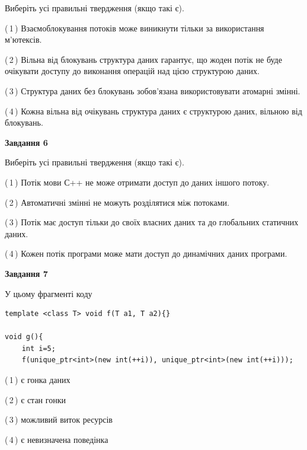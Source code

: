 \documentclass[12pt, ukrainian]{article}
\begin{document}
\begin {large}
{Виберіть усі правильні твердження (якщо такі є).\par
\vspace{2mm}

(\,1\,) Взаємоблокування потоків може виникнути тільки за використання м’ютексів.%

(\,2\,) Вільна від блокувань структура даних гарантує, що жоден потік не буде очікувати доступу до виконання операцій над цією структурою даних.%

(\,3\,) Структура даних без блокувань зобов’язана використовувати атомарні змінні.%

(\,4\,) Кожна вільна від очікувань структура даних є структурою даних, вільною від блокувань.%
\newpage


\begin{center}
\textbf{Завдання 6}
\end{center}

Виберіть усі правильні твердження (якщо такі є).\par
\vspace{2mm}

(\,1\,) Потік мови С++ не може отримати доступ до даних іншого потоку.%

(\,2\,) Автоматичні змінні не можуть розділятися між потоками.%

(\,3\,) Потік має доступ тільки до своїх власних даних та до глобальних статичних даних.%

(\,4\,) Кожен потік програми може мати доступ до динамічних даних програми.%


\begin{center}
\textbf{Завдання 7}
\end{center}

У цьому фрагменті коду
\begin{verbatim}
template <class T> void f(T a1, T a2){}

void g(){
    int i=5;
    f(unique_ptr<int>(new int(++i)), unique_ptr<int>(new int(++i)));
\end{verbatim}

(\,1\,) є гонка даних%

(\,2\,) є стан гонки%

(\,3\,) можливий виток ресурсів%

(\,4\,) є невизначена поведінка%

}
\end {large}

\vspace{4mm}
\newpage
\end{document}
